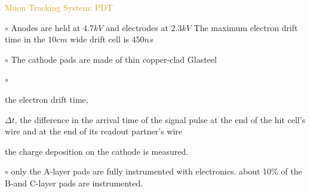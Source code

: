 \begin{frame}{\textcolor{Goldenrod}{Muon Tracking System: PDT}}
  \begin{overlayarea}{\textwidth}{\textheight}
    \itt

  \item[$\circ$] Anodes are held at $4.7 kV$ and electrodes at $2.3 kV$
    The maximum electron drift time in the $10 cm$ wide drift cell is
    $450 ns$
    
  \item[$\circ$] The cathode pads are made of
    thin copper-clad Glasteel
    
  \item[$\circ$] 
    \itt
  \item the electron drift time,
  \item \alert{ $\Delta t$, the difference in the arrival time of the signal
      pulse at the end of the hit cell’s wire and at the end of its readout
      partner’s wire}
  \item the charge deposition on the cathode is measured.
    \tti
  \item[$\circ$]
    \alert{only the A-layer pads are fully instrumented with electronics.
    about 10\% of the B-and C-layer pads are instrumented.}
  \tti
  \end{overlayarea}
\end{frame}

